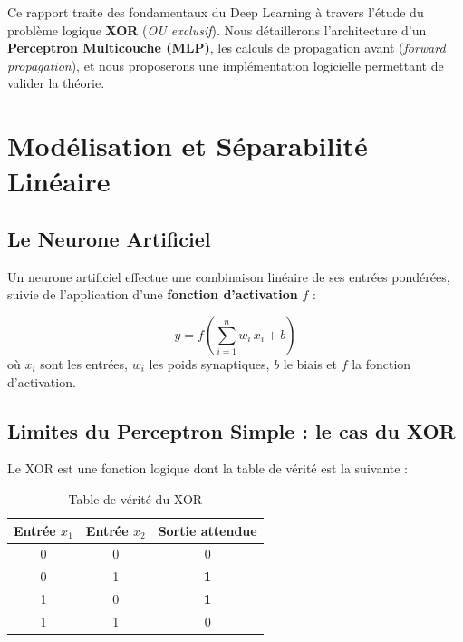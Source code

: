 \documentclass[12pt, a4paper]{article}
\begin{document}
Ce rapport traite des fondamentaux du Deep Learning à travers l'étude du problème logique
\textbf{XOR} (\textit{OU exclusif}). Nous détaillerons l'architecture d'un
\textbf{Perceptron Multicouche (MLP)}, les calculs de propagation avant
(\textit{forward propagation}), et nous proposerons une implémentation logicielle
permettant de valider la théorie.

\section{Modélisation et Séparabilité Linéaire}

\subsection{Le Neurone Artificiel}

Un neurone artificiel effectue une combinaison linéaire de ses entrées pondérées,
suivie de l'application d'une \textbf{fonction d'activation} $f$ :

\begin{mathbox}
\begin{equation}
    y = f\!\left(\sum_{i=1}^{n} w_i\, x_i + b\right)
    \label{eq:neuron}
\end{equation}
où $x_i$ sont les entrées, $w_i$ les poids synaptiques, $b$ le biais et $f$ la
fonction d'activation.
\end{mathbox}

\subsection{Limites du Perceptron Simple : le cas du XOR}

Le XOR est une fonction logique dont la table de vérité est la suivante :

\begin{table}[H]
    \centering
    \caption{Table de vérité du XOR}
    \label{tab:xor}
    \renewcommand{\arraystretch}{1.4}
    \begin{tabular}{ccc}
        \toprule
        \rowcolor{espblue!15}
        \textbf{Entrée $x_1$} & \textbf{Entrée $x_2$} & \textbf{Sortie attendue} \\
        \midrule
        0 & 0 & 0 \\
        0 & 1 & \cellcolor{codegreen!20}\textbf{1} \\
        1 & 0 & \cellcolor{codegreen!20}\textbf{1} \\
        1 & 1 & 0 \\
        \bottomrule
    \end{tabular}
\end{table}
\end{document}
